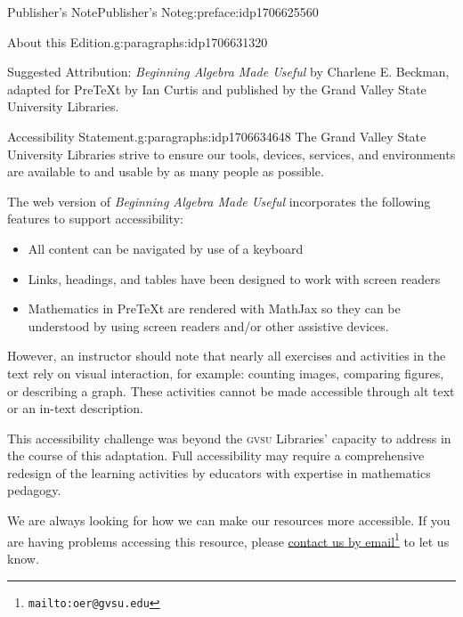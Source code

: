 \documentclass[oneside,10pt,]{book}
\newcommand{\initialism}[1]{\textsc{\MakeLowercase{#1}}}
\newcommand{\pubtitle}[1]{\textsl{#1}}
\numberwithin{equation}{chapter}
\begin{document}
\begin{preface}{Publisher's Note}{}{Publisher's Note}{}{}{g:preface:idp1706625560}
\begin{paragraphs}{About this Edition.}{g:paragraphs:idp1706631320}
\par
Suggested Attribution: \pubtitle{Beginning Algebra Made Useful} by Charlene E. Beckman, adapted for PreTeXt by Ian Curtis and published by the Grand Valley State University Libraries.%
\end{paragraphs}%
\begin{paragraphs}{Accessibility Statement.}{g:paragraphs:idp1706634648}%
The Grand Valley State University Libraries strive to ensure our tools, devices, services, and environments are available to and usable by as many people as possible.%
\par
The web version of \pubtitle{Beginning Algebra Made Useful} incorporates the following features to support accessibility:%
\begin{itemize}[label=\textbullet]
\item{}All content can be navigated by use of a keyboard%
\item{}Links, headings, and tables have been designed to work with screen readers%
\item{}Mathematics in PreTeXt are rendered with MathJax so they can be understood by using screen readers and\slash{}or other assistive devices.%
\end{itemize}
%
\par
However, an instructor should note that nearly all exercises and activities in the text rely on visual interaction, for example: counting images, comparing figures, or describing a graph. These activities cannot be made accessible through alt text or an in-text description.%
\par
This accessibility challenge was beyond the \initialism{GVSU} Libraries' capacity to address in the course of this adaptation. Full accessibility may require a comprehensive redesign of the learning activities by educators with expertise in mathematics pedagogy.%
\par
We are always looking for how we can make our resources more accessible. If you are having problems accessing this resource, please \href{mailto:oer@gvsu.edu}{contact us by email}\footnote{\nolinkurl{mailto:oer@gvsu.edu}\label{g:fn:idp1706648984}} to let us know.%
\end{paragraphs}%
\end{preface}
\setcounter{tocdepth}{1}
\renewcommand*\contentsname{Contents}
\tableofcontents
\mainmatter
%
%
\typeout{************************************************}
\end{document}
